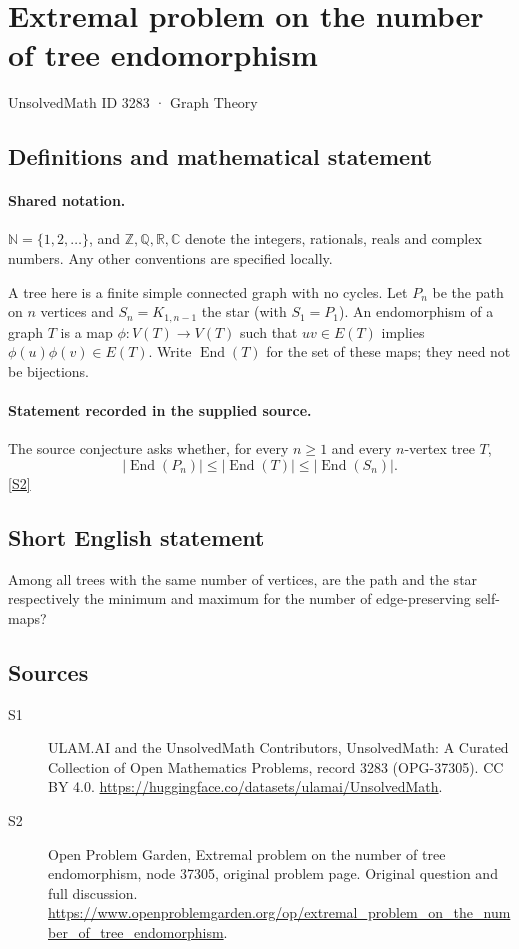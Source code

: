 \documentclass[11pt]{article}
\newcommand{\sref}[2]{\hyperlink{source:#1:#2}{[S#2]}}
\begin{document}
\setcounter{section}{3282}
\section{Extremal problem on the number of tree endomorphism}\label{3283}
{\small\sffamily UnsolvedMath ID 3283 · Graph Theory}
\subsection{Definitions and mathematical statement}

\paragraph{Shared notation.}$\mathbb N=\{1,2,\ldots\}$, and $\mathbb Z,\mathbb Q,\mathbb R,\mathbb C$ denote the integers, rationals, reals and complex numbers. Any other conventions are specified locally.


A tree here is a finite simple connected graph with no cycles. Let $P_n$ be the path on $n$ vertices and $S_n=K_{1,n-1}$ the star (with $S_1=P_1$). An endomorphism of a graph $T$ is a map $\phi:V(T)\to V(T)$ such that $uv\in E(T)$ implies $\phi(u)\phi(v)\in E(T)$. Write $\operatorname{End}(T)$ for the set of these maps; they need not be bijections.
\paragraph{Statement recorded in the supplied source.}
The source conjecture asks whether, for every $n\geq1$ and every $n$-vertex tree $T$,\[ |\operatorname{End}(P_n)|\leq |\operatorname{End}(T)|\leq |\operatorname{End}(S_n)|. \] \sref{3283}{2}
\subsection{Short English statement}
Among all trees with the same number of vertices, are the path and the star respectively the minimum and maximum for the number of edge-preserving self-maps?
\subsection{Sources}
\begin{description}
\item[\hypertarget{source:3283:1}{S1}] ULAM.AI and the UnsolvedMath Contributors, UnsolvedMath: A Curated Collection of Open Mathematics Problems, record 3283 (OPG-37305). CC BY 4.0. \url{https://huggingface.co/datasets/ulamai/UnsolvedMath}.
\item[\hypertarget{source:3283:2}{S2}] Open Problem Garden, Extremal problem on the number of tree endomorphism, node 37305, original problem page. Original question and full discussion. \url{https://www.openproblemgarden.org/op/extremal_problem_on_the_number_of_tree_endomorphism}.

\end{description}
\label{end:3283}
\end{document}
